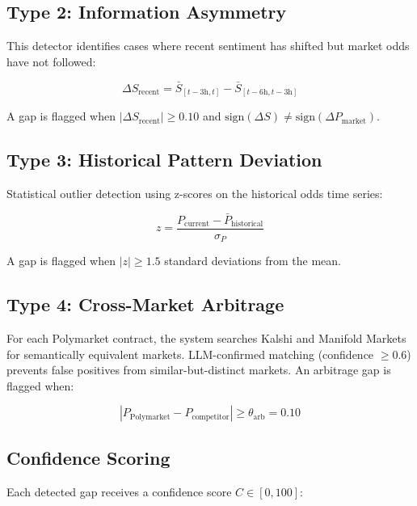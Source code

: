 \documentclass[12pt, letterpaper]{article}
\begin{document}
\subsection{Type 2: Information Asymmetry}

This detector identifies cases where recent sentiment has shifted but market odds have not followed:

\begin{equation}
    \Delta S_{\text{recent}} = \bar{S}_{[t-3\text{h}, t]} - \bar{S}_{[t-6\text{h}, t-3\text{h}]}
\end{equation}

A gap is flagged when $|\Delta S_{\text{recent}}| \geq 0.10$ and $\text{sign}(\Delta S) \neq \text{sign}(\Delta P_{\text{market}})$.

\subsection{Type 3: Historical Pattern Deviation}

Statistical outlier detection using z-scores on the historical odds time series:

\begin{equation}
    z = \frac{P_{\text{current}} - \bar{P}_{\text{historical}}}{\sigma_{P}}
\end{equation}

A gap is flagged when $|z| \geq 1.5$ standard deviations from the mean.

\subsection{Type 4: Cross-Market Arbitrage}

For each Polymarket contract, the system searches Kalshi and Manifold Markets for semantically equivalent markets. LLM-confirmed matching (confidence $\geq 0.6$) prevents false positives from similar-but-distinct markets. An arbitrage gap is flagged when:

\begin{equation}
    |P_{\text{Polymarket}} - P_{\text{competitor}}| \geq \theta_{\text{arb}} = 0.10
\end{equation}

\subsection{Confidence Scoring}

Each detected gap receives a confidence score $C \in [0, 100]$:
\end{document}
